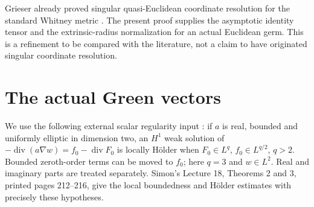 \documentclass[11pt]{article}
\theoremstyle{remark}\newtheorem{remark}[theorem]{Remark}
\begin{document}
Grieser already proved singular quasi-Euclidean coordinate resolution for the
standard Whitney metric \cite{grieser}. The present proof supplies the
asymptotic identity tensor and the extrinsic-radius normalization for an
actual Euclidean germ. This is a refinement to be compared with the literature,
not a claim to have originated singular coordinate resolution.

\section{The actual Green vectors}\label{sec:green}
We use the following external scalar regularity input \cite{simon}:
if $a$ is real, bounded and uniformly elliptic in dimension two, an $H^1$
weak solution of
$-\operatorname{div}(a\nabla w)=f_0-\operatorname{div}F_0$
is locally H\"older when $F_0\in L^q$, $f_0\in L^{q/2}$, $q>2$.
Bounded zeroth-order terms can be moved to $f_0$; here $q=3$ and $w\in L^2$.
Real and imaginary parts are treated separately. Simon's Lecture 18,
Theorems 2 and 3, printed pages 212--216, give the local boundedness and
H\"older estimates with precisely these hypotheses.
\end{document}
